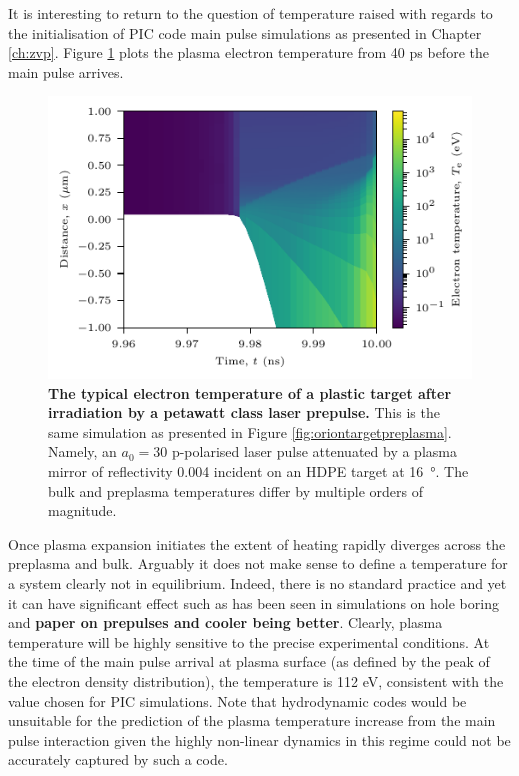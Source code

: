 
It is interesting to return to the question of temperature raised with regards to the initialisation of PIC code main pulse simulations as presented in Chapter \ref{ch:zvp}. Figure \ref{fig:oriontemperature} plots the plasma electron temperature from 40 ps before the main pulse arrives.
\begin{figure}
	\centering
	\includegraphics{figures/orion/orion_temperature}
	\caption[Typical electron temperature of a plastic target after irradiation by a petawatt class laser prepulse.]{\textbf{The typical electron temperature of a plastic target after irradiation by a petawatt class laser prepulse.} This is the same simulation as presented in Figure \ref{fig:oriontargetpreplasma}. Namely, an $a_0 = 30$ p-polarised laser pulse attenuated by a plasma mirror of reflectivity 0.004 incident on an HDPE target at \qty{16}{\degree}. The bulk and preplasma temperatures differ by multiple orders of magnitude.}
	\label{fig:oriontemperature}
\end{figure}
Once plasma expansion initiates the extent of heating rapidly diverges across the preplasma and bulk. Arguably it does not make sense to define a temperature for a system clearly not in equilibrium. Indeed, there is no standard practice and yet it can have significant effect such as has been seen in simulations on hole boring and \textbf{ paper on prepulses and cooler being better}. Clearly, plasma temperature will be highly sensitive to the precise experimental conditions. At the time of the main pulse arrival at plasma surface (as defined by the peak of the electron density distribution), the temperature is 112 eV, consistent with the value chosen for PIC simulations. Note that hydrodynamic codes would be unsuitable for the prediction of the plasma temperature increase from the main pulse interaction given the highly non-linear dynamics in this regime could not be accurately captured by such a code.

